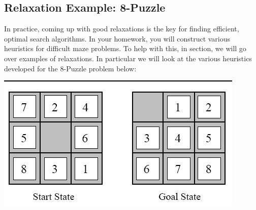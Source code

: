 \documentclass[11pt]{article}
\begin{document}
\subsection{Relaxation Example: 8-Puzzle}

In practice, coming up with good relaxations is the key for finding efficient, optimal search algorithms. In your homework, you will construct various heuristics for difficult maze problems. To help with this, in section, we will go over examples of relaxations. In particular we will look at the various heuristics developed for the 8-Puzzle problem below: 

\begin{center}
  \includegraphics{pics/puzzle}
\end{center}


\end{document}
